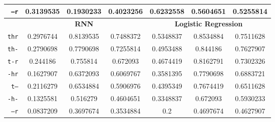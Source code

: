\documentclass[../main.tex]{subfiles}
\begin{document}
\begin{table}[ht]
\begin{small}
\begin{tabular}{|r|c|c|c|c|c|c|}
		\texttt{--r} & 0.3139535 & 0.1930233 & 0.4023256 & 0.6232558 & 0.5604651 & 0.5255814 \\
		\hline
		 & \multicolumn{3}{|c|}{\textbf{RNN}} & \multicolumn{3}{|c|}{\textbf{Logistic Regression}} \\
		\hline
		\texttt{thr} & 0.2976744 & 0.8139535 & 0.7488372 & 0.5348837 & 0.8534884 & 0.7511628 \\
		\texttt{th-} & 0.2790698 & 0.7790698 & 0.7255814 & 0.4953488 & 0.844186 & 0.7627907 \\
		\texttt{t-r} & 0.244186 & 0.755814 & 0.672093 & 0.4674419 & 0.8162791 & 0.7302326 \\
		\texttt{-hr} & 0.1627907 & 0.6372093 & 0.6069767 & 0.3581395 & 0.7790698 & 0.6883721 \\
		\texttt{t--} & 0.2116279 & 0.6534884 & 0.5906976 & 0.4395349 & 0.7674419 & 0.6511628 \\
		\texttt{-h-} & 0.1325581 & 0.516279 & 0.4604651 & 0.3348837 & 0.672093 & 0.5930233 \\
		\texttt{--r} & 0.0837209 & 0.3697674 & 0.3534884 & 0.2 & 0.4697674 & 0.4627907 \\
		\hline
	\end{tabular}
	\end{small}
\end{table}
\end{document}
